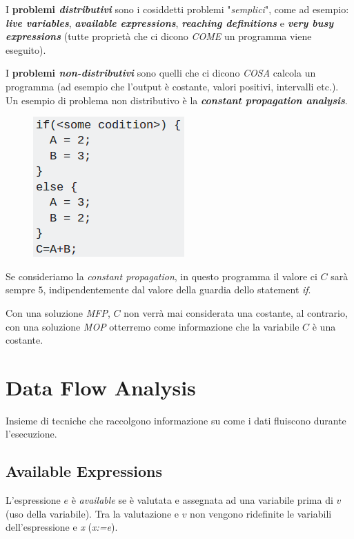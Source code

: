 \documentclass[a4paper, 10pt]{book}
\begin{document}
I \textbf{problemi \textit{distributivi}} sono i cosiddetti problemi "\textit{semplici}", come ad esempio: \textit{\textbf{live variables}}, \textit{\textbf{available expressions}}, \textit{\textbf{reaching definitions}} e \textit{\textbf{very busy expressions}} (tutte proprietà che ci dicono \textit{COME} un programma viene eseguito).

I \textbf{problemi \textit{non-distributivi}} sono quelli che ci dicono \textit{COSA} calcola un programma (ad esempio che l'output è costante, valori positivi, intervalli etc.). Un esempio di problema non distributivo è la \textit{\textbf{constant propagation analysis}}.

\begin{multicols}{2}	
	\begin{figure}[H]
		\centering
		\includegraphics[scale=0.55]{pngs/MOPMFP}
	\end{figure}
	\columnbreak
	Se consideriamo la \textit{constant propagation}, in questo programma il valore ci $C$ sarà sempre $5$, indipendentemente dal valore della guardia dello statement \textit{if}.
	
	Con una soluzione \textit{MFP}, $C$ non verrà mai considerata una costante, al contrario, con una soluzione \textit{MOP} otterremo come informazione che la variabile $C$ è una costante.
\end{multicols}

\newpage
\section{Data Flow Analysis}
Insieme di tecniche che raccolgono informazione su come i dati fluiscono durante l'esecuzione.

\subsection{Available Expressions}
L'espressione $e$ è \textit{available} se è valutata e assegnata ad una variabile prima di $v$ (uso della variabile). Tra la valutazione e $v$ non vengono ridefinite le variabili dell'espressione e \textit{x} (\textit{x:=e}).
\newline
\end{document}
